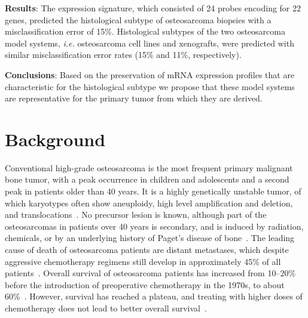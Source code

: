 \textbf{Results}: The expression signature, which consisted of 24 probes encoding for 22 genes, predicted the histological
subtype of osteosarcoma biopsies with a misclassification error of 15\%. Histological subtypes of the two
osteosarcoma model systems, {\it i.e.} osteosarcoma cell lines and xenografts, were predicted with similar
misclassification error rates (15\% and 11\%, respectively).

\textbf{Conclusions}: Based on the preservation of mRNA expression profiles that are characteristic for the histological
subtype we propose that these model systems are representative for the primary tumor from which they are
derived.

\section{Background}\label{introduction3}
Conventional high\hyp{}grade osteosarcoma is the most frequent
primary malignant bone tumor, with a peak
occurrence in children and adolescents and a second
peak in patients older than 40 years. It is a highly
genetically unstable tumor, of which karyotypes often
show aneuploidy, high level amplification and deletion,
and translocations~\cite{cleton2005central}. No precursor lesion is known,
although part of the osteosarcomas in patients over 40
years is secondary, and is induced by radiation, chemicals,
or by an underlying history of Paget's disease of
bone~\cite{raymond2002conventional}. The leading cause of death of osteosarcoma
patients are distant metastases, which despite aggressive
chemotherapy regimens still develop in approximately
45\% of all patients~\cite{buddingh2010prognostic}. Overall survival of osteosarcoma
patients has increased from 10--20\% before the introduction
of preoperative chemotherapy in the 1970s, to
about 60\%~\cite{rozeman2006pathology}. However, survival has reached a plateau,
and treating with higher doses of chemotherapy does
not lead to better overall survival~\cite{lewis2007improvement}.

